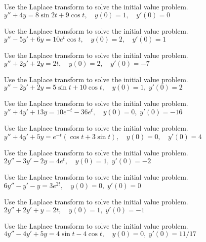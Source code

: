 \documentclass{ximera}
\begin{document}
\begin{problem}\label{exer:8.3.26} Use the Laplace transform to solve the initial value problem.  $y''+4y=8\sin2t+9\cos t, \quad  y(0)=1,\quad y'(0)=0$
\end{problem}

\begin{problem}\label{exer:8.3.27} Use the Laplace transform to solve the initial value problem. $y''-5y'+6y=10e^t\cos t, \quad  y(0)=2,\quad y'(0)=1$
\end{problem}

\begin{problem}\label{exer:8.3.28} Use the Laplace transform to solve the initial value problem. $y''+2y'+2y=2t, \quad  y(0)=2,\quad y'(0)=-7$
\end{problem}

\begin{problem}\label{exer:8.3.29} Use the Laplace transform to solve the initial value problem. $y''-2y'+2y=5\sin t+10\cos t, \quad  y(0)=1,\;
y'(0)=2$
\end{problem}

\begin{problem}\label{exer:8.3.30} Use the Laplace transform to solve the initial value problem. $y''+4y'+13y=10e^{-t}-36e^t, \quad  y(0)=0,\;
y'(0)=-16$
\end{problem}

\begin{problem}\label{exer:8.3.31} Use the Laplace transform to solve the initial value problem. $y''+4y'+5y=e^{-t}(\cos t+3\sin t), \quad
y(0)=0,\quad y'(0)=4$
\end{problem}

\begin{problem}\label{exer:8.3.32} Use the Laplace transform to solve the initial value problem. $2y''-3y'-2y=4e^t, \quad   y(0)=1,\;  y'(0)=-2$
\end{problem}

\begin{problem}\label{exer:8.3.33} Use the Laplace transform to solve the initial value problem. $6y''-y'-y=3e^{2t}, \quad   y(0)=0,\;  y'(0)=0$
\end{problem}

\begin{problem}\label{exer:8.3.34} Use the Laplace transform to solve the initial value problem. $2y''+2y'+y=2t, \quad   y(0)=1,\;  y'(0)=-1$
\end{problem}

\begin{problem}\label{exer:8.3.35} Use the Laplace transform to solve the initial value problem. $4y''-4y'+5y=4\sin t-4\cos t, \quad   y(0)=0,\;  y'(0)=11/17$
\end{problem}
\end{document}
